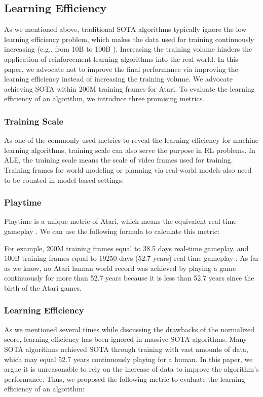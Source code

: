 \documentclass[nohyperref]{article}
\theoremstyle{plain}
\begin{document}
\subsection{Learning Efficiency}
As we mentioned above, traditional SOTA algorithms typically ignore the low learning efficiency problem, which makes the data used for training continuously increasing (e.g., from 10B \citep{r2d2} to 100B \citep{agent57}). Increasing the training volume hinders the application of reinforcement learning algorithms into the real world. In this paper, we advocate not to improve the final performance via improving the learning efficiency instead of increasing the training volume. We advocate achieving SOTA within 200M training frames for Atari. To evaluate the learning efficiency of an algorithm, we introduce three promising metrics.

\subsubsection{Training Scale}
As one of the commonly used metrics to reveal the learning efficiency for machine learning algorithms, training scale can also serve the purpose in RL problems. In ALE, the training scale means the scale of video frames used for training. Training frames for world modeling or planning via real-world models also need to be counted in model-based settings.

\subsubsection{Playtime}
Playtime is a unique metric of Atari, which means the equivalent real-time gameplay \citep{ale2}. We can use the following formula to calculate this metric:

For example, 200M training frames equal to 38.5 days real-time gameplay, and 100B training frames equal to 19250 days (52.7 years) real-time gameplay \citep{agent57}. As far as we know, no Atari human world record was achieved by playing a game continuously for more than 52.7 years because it is less than 52.7 years since the birth of the Atari games.

\subsubsection{Learning Efficiency}
As we mentioned several times while discussing the drawbacks of the normalized score, learning efficiency has been ignored in massive SOTA algorithms. Many SOTA algorithms achieved SOTA through training with vast amounts of data, which may equal 52.7 years continuously playing for a human. In this paper, we argue it is unreasonable to rely on the increase of data to improve the algorithm's performance. Thus, we proposed the following metric to evaluate the learning efficiency of an algorithm: 
\end{document}
